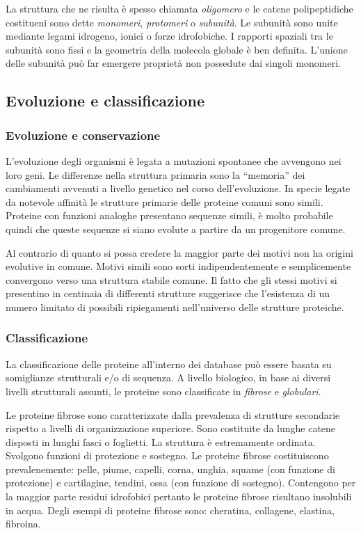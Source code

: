 {{La struttura che ne risulta è spesso chiamata \textit{oligomero} e le catene polipeptidiche costitueni sono dette \textit{monomeri}, \textit{protomeri} o \textit{subunità}. Le subunità sono unite mediante legami idrogeno, ionici o forze idrofobiche. I rapporti spaziali tra le subunità sono fissi e la geometria della molecola globale è ben definita.
L'unione delle subunità può far emergere proprietà non possedute dai singoli monomeri.
}
\subsection{Evoluzione e classificazione}
{
\subsubsection{Evoluzione e conservazione}
L’evoluzione degli organismi è legata a mutazioni spontanee che avvengono nei loro geni. Le differenze nella struttura primaria sono la “memoria” dei cambiamenti avvenuti a livello genetico nel corso dell’evoluzione. In specie legate da notevole affinità le strutture primarie delle proteine comuni sono
simili. Proteine con funzioni analoghe presentano sequenze simili, è molto probabile quindi che queste sequenze si siano evolute a partire da un progenitore comune. 

\par Al contrario di quanto si possa credere la maggior parte dei motivi non ha origini evolutive in comune. Motivi simili sono sorti indipendentemente e semplicemente convergono verso una struttura stabile comune. Il fatto che gli stessi motivi si presentino in centinaia di differenti strutture suggerisce che l'esistenza di un numero limitato di possibili ripiegamenti nell'universo delle strutture proteiche\supercite{proteinMotifs}. 

\subsubsection{Classificazione} \label{sec:classificazione}
La classificazione delle proteine all'interno dei database può essere basata su somiglianze strutturali e/o di sequenza. A livello biologico, in base ai diversi livelli strutturali assunti, le proteine sono classificate in \textit{fibrose} e \textit{globulari}.

\par Le proteine fibrose sono caratterizzate dalla prevalenza di strutture secondarie rispetto a livelli di organizzazione superiore. Sono costituite da lunghe catene disposti in lunghi fasci o foglietti. La struttura è estremamente ordinata. Svolgono funzioni di protezione e sostegno. Le proteine fibrose costituiscono prevalenemente: pelle, piume, capelli, corna, unghia, squame (con funzione di protezione) e cartilagine, tendini, ossa (con funzione di sostegno). Contengono per la maggior parte residui idrofobici pertanto le proteine fibrose risultano insolubili in acqua. Degli esempi di proteine fibrose sono: cheratina, collagene, elastina, fibroina. 

}}

